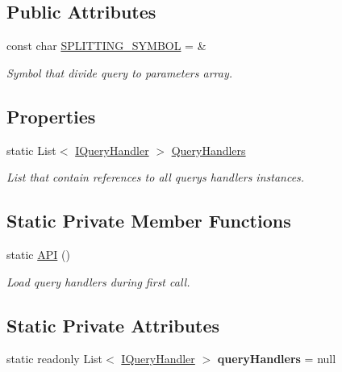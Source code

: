 \subsection*{Public Attributes}
\begin{DoxyCompactItemize}
\item 
const char \mbox{\hyperlink{class_uniform_queries_1_1_a_p_i_aa906970223172f9f2068baa410b621d8}{S\+P\+L\+I\+T\+T\+I\+N\+G\+\_\+\+S\+Y\+M\+B\+OL}} = \textquotesingle{}\&\textquotesingle{}
\begin{DoxyCompactList}\small\item\em Symbol that divide query to parameters array. \end{DoxyCompactList}\end{DoxyCompactItemize}
\subsection*{Properties}
\begin{DoxyCompactItemize}
\item 
static List$<$ \mbox{\hyperlink{interface_uniform_queries_1_1_executable_1_1_i_query_handler}{I\+Query\+Handler}} $>$ \mbox{\hyperlink{class_uniform_queries_1_1_a_p_i_a759098e511956b9afaaaf3ab13af336e}{Query\+Handlers}}
\begin{DoxyCompactList}\small\item\em List that contain references to all query\textquotesingle{}s handlers instances. \end{DoxyCompactList}\end{DoxyCompactItemize}
\subsection*{Static Private Member Functions}
\begin{DoxyCompactItemize}
\item 
static \mbox{\hyperlink{class_uniform_queries_1_1_a_p_i_a8dbe3d00dcf507ab3cea1dc58e1e154f}{A\+PI}} ()
\begin{DoxyCompactList}\small\item\em Load query handlers during first call. \end{DoxyCompactList}\end{DoxyCompactItemize}
\subsection*{Static Private Attributes}
\begin{DoxyCompactItemize}
\item 
\mbox{\label{class_uniform_queries_1_1_a_p_i_a8ec82d8dfe03f81379e43520e0b0abde}} 
static readonly List$<$ \mbox{\hyperlink{interface_uniform_queries_1_1_executable_1_1_i_query_handler}{I\+Query\+Handler}} $>$ {\bfseries query\+Handlers} = null
\end{DoxyCompactItemize}


